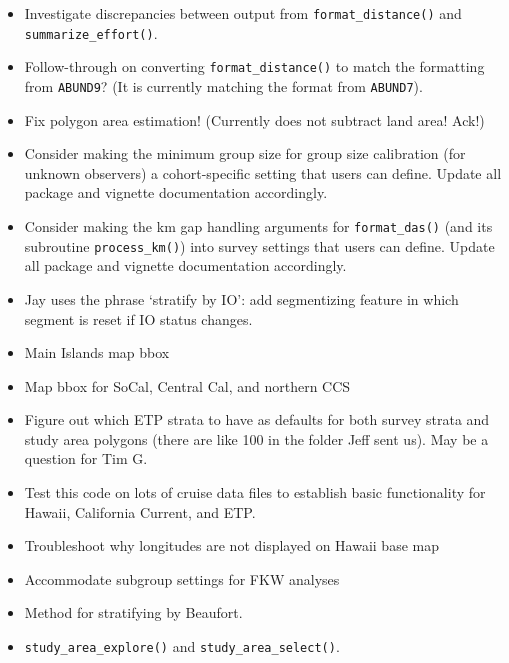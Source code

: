 \documentclass[
]{book}
\begin{document}
\begin{itemize}
\item
  Investigate discrepancies between output from \texttt{format\_distance()} and \texttt{summarize\_effort()}.
\item
  Follow-through on converting \texttt{format\_distance()} to match the formatting from \texttt{ABUND9}? (It is currently matching the format from \texttt{ABUND7}).
\item
  Fix polygon area estimation! (Currently does not subtract land area! Ack!)
\item
  Consider making the minimum group size for group size calibration (for unknown observers) a cohort-specific setting that users can define. Update all package and vignette documentation accordingly.
\item
  Consider making the km gap handling arguments for \texttt{format\_das()} (and its subroutine \texttt{process\_km()}) into survey settings that users can define. Update all package and vignette documentation accordingly.
\item
  Jay uses the phrase `stratify by IO': add segmentizing feature in which segment is reset if IO status changes.
\item
  Main Islands map bbox
\item
  Map bbox for SoCal, Central Cal, and northern CCS
\item
  Figure out which ETP strata to have as defaults for both survey strata and study area polygons (there are like 100 in the folder Jeff sent us). May be a question for Tim G.
\item
  Test this code on lots of cruise data files to establish basic functionality for Hawaii, California Current, and ETP.
\item
  Troubleshoot why longitudes are not displayed on Hawaii base map
\item
  Accommodate subgroup settings for FKW analyses
\item
  Method for stratifying by Beaufort.
\item
  \texttt{study\_area\_explore()} and \texttt{study\_area\_select()}.
\end{itemize}

  
\end{document}
